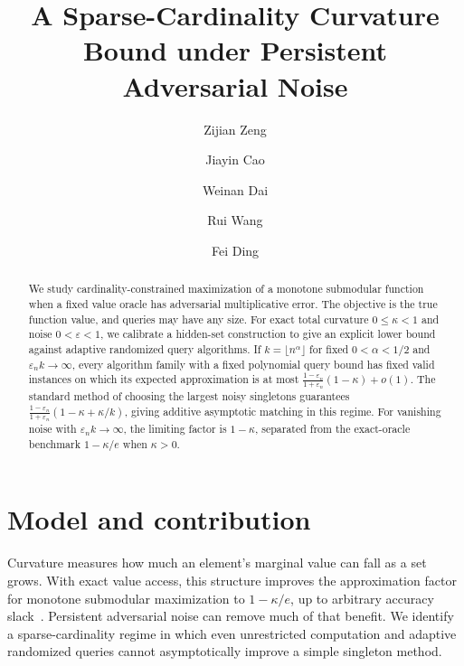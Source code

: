 \documentclass[manuscript,11pt,screen,nonacm]{acmart}
\title{A Sparse-Cardinality Curvature Bound under Persistent Adversarial Noise}
\author{Zijian Zeng}
\affiliation{\institution{UCSI University}\city{}\country{Malaysia}}
\author{Jiayin Cao}
\affiliation{\institution{Ningbo University}\city{}\country{China}}
\author{Weinan Dai}
\affiliation{\institution{Zhejiang University}\city{}\country{China}}
\author{Rui Wang}
\affiliation{\institution{Nanchang Institute of Technology}\city{}\country{China}}
\author{Fei Ding}
\affiliation{\institution{Alibaba Group}\city{}\country{China}}
\date{}
\newcommand{\eps}{\varepsilon}
\begin{document}
\singlespacing
\begin{abstract}
\normalsize
We study cardinality-constrained maximization of a monotone submodular
function when a fixed value oracle has adversarial multiplicative error.
The objective is the true function value, and queries may have any size.
For exact total curvature $0\le\kappa<1$ and noise $0<\eps<1$, we calibrate
a hidden-set construction to give an explicit lower bound against adaptive
randomized query algorithms. If $k=\lfloor n^\alpha\rfloor$ for fixed
$0<\alpha<1/2$ and $\eps_n k\to\infty$, every algorithm family with a fixed
polynomial query bound has fixed valid instances on which its expected
approximation is at most
$\frac{1-\eps_n}{1+\eps_n}(1-\kappa)+o(1)$.
The standard method of choosing the largest noisy singletons guarantees
$\frac{1-\eps_n}{1+\eps_n}(1-\kappa+\kappa/k)$, giving additive asymptotic
matching in this regime. For vanishing noise with $\eps_n k\to\infty$,
the limiting factor is $1-\kappa$, separated from the exact-oracle
benchmark $1-\kappa/e$ when $\kappa>0$.
\end{abstract}
\hypersetup{pageanchor=false}
\maketitle
{}
\enlargethispage{-12pt}
\thispagestyle{empty}
\clearpage
\setcounter{page}{1}
\hypersetup{pageanchor=true}
\pagestyle{submission}

\section{Model and contribution}

Curvature measures how much an element's marginal value can fall as a set
grows. With exact value access, this structure improves the approximation
factor for monotone submodular maximization to $1-\kappa/e$, up to arbitrary
accuracy slack~\cite[Theorems 6.1 and 7.1]{SVW14}. Persistent adversarial
noise can remove much of that benefit. We identify a sparse-cardinality
regime in which even unrestricted computation and adaptive randomized
queries cannot asymptotically improve a simple singleton method.
\end{document}
